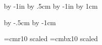 
















\vsize=297mm
\hsize=210mm

\advance\voffset by -1in
\advance\voffset by .5cm
\advance\hoffset by -1in
\advance\hoffset by 1cm

\advance\vsize by -.5cm
\advance\hsize by -1cm

\parindent=0pt

\enablehyperlinks[dvipdfm]

\font\largerm=cmr10  scaled \magstephalf
\font\largebf=cmbx10 scaled \magstephalf

\def\epsfsize#1#2{#1}

\hbox{}\hfil\break 

\vfil\eject
\bye

